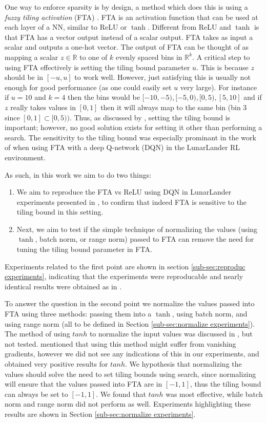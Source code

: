 \documentclass{article}
\newcommand{\RR}{\mathbb{R}}
\begin{document}
One way to enforce sparsity is by design, a method which does this is using a \textit{fuzzy tiling activation} (FTA) \cite[]{pan2019fuzzy}.
FTA is an activation function that can be used at each layer of a NN, similar to ReLU or $\tanh$.
Different from ReLU and $\tanh$ is that FTA has a vector output instead of a scalar output.
FTA takes as input a scalar and outputs a one-hot vector.
The output of FTA can be thought of as mapping a scalar $z \in \RR$ to one of $k$ evenly spaced bins in $\RR^k$.
A critical step to using FTA effectively is setting the tiling bound parameter $u$.
This is because $z$ should be in $[-u, u]$ to work well.
However, just satisfying this is usually not enough for good performance (as one could easily set $u$ very large).
For instance if $u = 10$ and $k = 4$ then the bins would be $[-10, -5), [-5, 0), [0, 5), [5, 10]$
and if $z$ really takes values in $[0,1]$ then it will always map to the same bin (bin $3$ since $[0, 1] \subset [0, 5))$.
Thus, as discussed by \cite[]{pan2019fuzzy}, setting the tiling bound is important; however, no good solution exists for setting it other than performing a search.
The sensitivity to the tiling bound was especially prominant in the work of \cite[]{pan2019fuzzy} when using FTA with a deep Q-network (DQN) \cite[]{mnih2013playing} in the LunarLander RL environment.

As such, in this work we aim to do two things:
\begin{enumerate}
  \item We aim to reproduce the FTA vs ReLU using DQN in LunarLander experiments presented in \cite[]{pan2019fuzzy}, to confirm that indeed FTA is sensitive to the tiling bound in this setting.
  \item Next, we aim to test if the simple technique of normalizing the values (using $\tanh$, batch norm, or range norm) passed to FTA can remove the need for tuning the tiling bound parameter in FTA.
\end{enumerate}

Experiments related to the first point are shown in section \ref{sub-sec:reproduc experiments}, indicating that the experiments were reproducable and nearly identical results were obtained as in \cite[]{pan2019fuzzy}.

To answer the question in the second point we normalize the values passed into FTA using three methods: passing them into a $\tanh$, using batch norm, and using range norm (all to be defined in Section \ref{sub-sec:normalize experiments}).
The method of using $tanh$ to normalize the input values was discussed in \cite{pan2019fuzzy}, but not tested.
\cite{pan2019fuzzy} mentioned that using this method might suffer from vanishing gradients, however we did not see any indications of this in our experiments, and obtained very positive results for $tanh$.
We hypothesis that normalizing the values should solve the need to set tiling bounds using search, since normalizing will ensure that the values passed into FTA are in $[-1, 1]$, thus the tiling bound can always be set to $[-1, 1]$.
We found that $tanh$ was most effective, while batch norm and range norm did not perform as well.
Experiments highlighting these results are shown in Section \ref{sub-sec:normalize experiments}.
\end{document}
